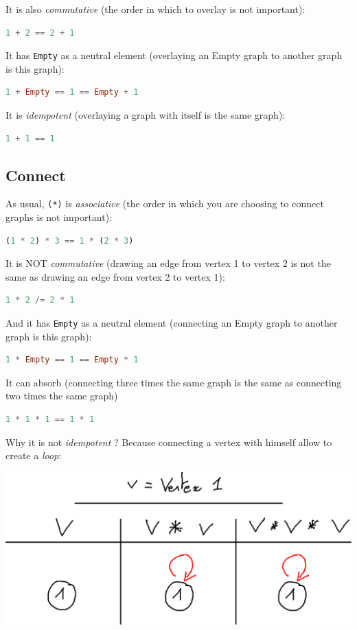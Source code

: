 \documentclass[10pt,a4paper]{article}
\begin{document}
It is also \emph{commutative} (the order in which to overlay is not important):
\begin{lstlisting}[language=Haskell, frame=single]
1 + 2 == 2 + 1
\end{lstlisting}

It has \verb|Empty| as a neutral element (overlaying an Empty graph to another graph is this graph):
\begin{lstlisting}[language=Haskell, frame=single]
1 + Empty == 1 == Empty + 1
\end{lstlisting}

It is \emph{idempotent} (overlaying a graph with itself is the same graph):
\begin{lstlisting}[language=Haskell, frame=single]
1 + 1 == 1
\end{lstlisting}

\subsection{Connect}
As usual, \verb|(*)| is \emph{associative} (the order in which you are choosing to connect graphs is not important):
\begin{lstlisting}[language=Haskell, frame=single]
(1 * 2) * 3 == 1 * (2 * 3)
\end{lstlisting}

It is NOT \emph{commutative} (drawing an edge from vertex 1 to vertex 2 is not the same as drawing an edge from vertex 2 to vertex 1):
\begin{lstlisting}[language=Haskell, frame=single]
1 * 2 /= 2 * 1
\end{lstlisting}

And it has \verb|Empty| as a neutral element (connecting an Empty graph to another graph is this graph):
\begin{lstlisting}[language=Haskell, frame=single]
1 * Empty == 1 == Empty * 1
\end{lstlisting}

It can absorb (connecting three times the same graph is the same as connecting two times the same graph)
\begin{lstlisting}[language=Haskell, frame=single]
1 * 1 * 1 == 1 * 1
\end{lstlisting}

Why it is not \emph{idempotent} ? Because connecting a vertex with himself allow to create a \emph{loop}:

\begin{center}
	\includegraphics[scale=0.5]{figspng/absorb.png}
\end{center}
\end{document}
